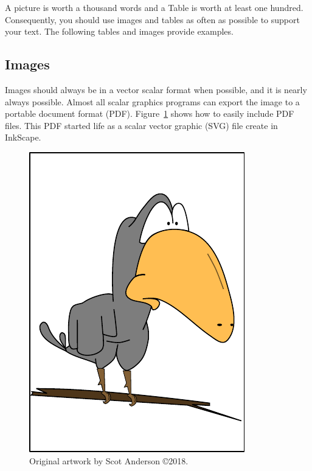 \documentclass[pdf,bookmarks,colorlinks=true]{IEEEtran}
\begin{document}
A picture is worth a thousand words and a Table is worth at least one hundred. Consequently, you should use images and tables as often as possible to support your text. The following tables and images provide examples.

\subsection{Images}

Images should always be in a vector scalar format when possible, and it is nearly always possible. Almost all scalar graphics programs can export the image to a portable document format (PDF). Figure~\ref{fig:crow} shows how to  easily include PDF files. This PDF started life as a scalar vector graphic (SVG) file create in InkScape. 

\begin{figure}[h]
    \centering
    \includegraphics[trim={0.1cm 1cm 0.1cm 1cm},clip,width=\columnwidth]{figures/Crow.pdf}
    \caption{Original artwork by Scot Anderson \copyright 2018.}
    \label{fig:crow}
\end{figure}
\end{document}
